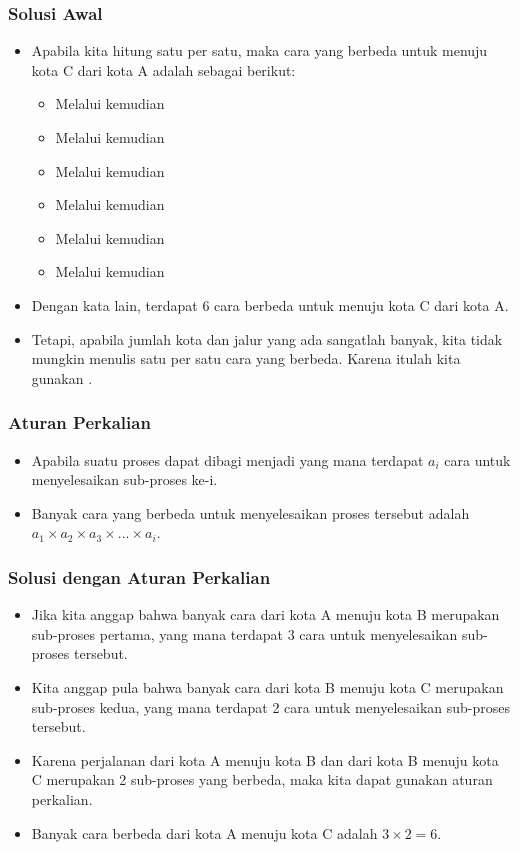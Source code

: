 \begin{frame}
\frametitle{Solusi Awal}
\begin{itemize}
  \item Apabila kita hitung satu per satu, maka cara yang berbeda untuk menuju kota C dari kota A adalah sebagai berikut:
  \begin{itemize}
    \item Melalui  kemudian 
    \item Melalui  kemudian 
    \item Melalui  kemudian 
    \item Melalui  kemudian 
    \item Melalui  kemudian 
    \item Melalui  kemudian 
  \end{itemize}
  \item Dengan kata lain, terdapat 6 cara berbeda untuk menuju kota C dari kota A.
  \item Tetapi, apabila jumlah kota dan jalur yang ada sangatlah banyak, kita tidak mungkin menulis satu per satu cara yang berbeda. Karena itulah kita gunakan .
\end{itemize}
\end{frame} 

\begin{frame}
\frametitle{Aturan Perkalian}
\begin{itemize}
  \item Apabila suatu proses dapat dibagi menjadi  yang mana terdapat $a_{i}$ cara untuk menyelesaikan sub-proses ke-i.
  \item Banyak cara yang berbeda untuk menyelesaikan proses tersebut adalah $a_{1} \times a_{2} \times a_{3} \times ... \times a_{i}$.	
\end{itemize}
\end{frame}

\begin{frame}
\frametitle{Solusi dengan Aturan Perkalian}
\begin{itemize}
  \item Jika kita anggap bahwa banyak cara dari kota A menuju kota B merupakan sub-proses pertama, yang mana terdapat 3 cara untuk menyelesaikan sub-proses tersebut.
  \item Kita anggap pula bahwa banyak cara dari kota B menuju kota C merupakan sub-proses kedua, yang mana terdapat 2 cara untuk menyelesaikan sub-proses tersebut.
  \item Karena perjalanan dari kota A menuju kota B dan dari kota B menuju kota C merupakan 2 sub-proses yang berbeda, maka kita dapat gunakan aturan perkalian.
  \item Banyak cara berbeda dari kota A menuju kota C adalah $3 \times 2 = 6$.
\end{itemize}
\end{frame}

